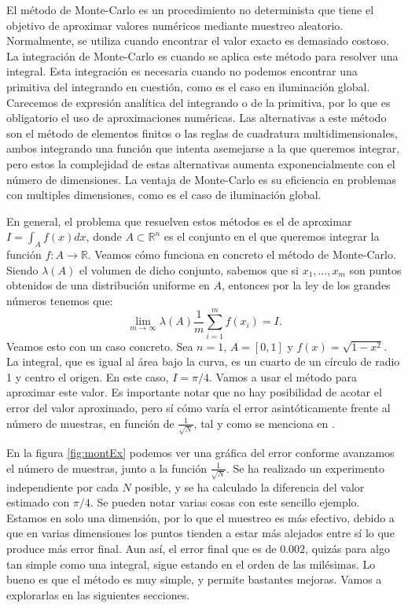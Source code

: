 \documentclass{scrbook}
\begin{document}
El método de Monte-Carlo es un procedimiento no determinista que tiene el objetivo de aproximar valores numéricos mediante muestreo aleatorio. Normalmente, se utiliza cuando encontrar el valor exacto es demasiado costoso. La integración de Monte-Carlo es cuando se aplica este método para resolver una integral. Esta integración es necesaria cuando no podemos encontrar una primitiva del integrando en cuestión, como es el caso en iluminación global. Carecemos de expresión analítica del integrando o de la primitiva, por lo que es obligatorio el uso de aproximaciones numéricas. Las alternativas a este método son el método de elementos finitos o las reglas de cuadratura multidimensionales, ambos integrando una función que intenta asemejarse a la que queremos integrar, pero estos la complejidad de estas alternativas aumenta exponencialmente con el número de dimensiones. La ventaja de Monte-Carlo es su eficiencia en problemas con multiples dimensiones, como es el caso de iluminación global. 

En general, el problema que resuelven estos métodos es el de aproximar $I = \int_{A}f(x) dx$, donde $A\subset\mathds{R}^n$ es el conjunto en el que queremos integrar la función $f:A\rightarrow\mathds{R}$. Veamos cómo funciona en concreto el método de Monte-Carlo. Siendo $\lambda(A)$ el volumen de dicho conjunto, sabemos que si $x_1, \hdots, x_m$ son puntos obtenidos de una distribución uniforme en $A$, entonces por la ley de los grandes números tenemos que:
$$\lim\limits_{m\rightarrow\infty} \lambda(A) \frac{1}{m} \sum_{i=1}^{m} f(x_i) = I.$$
Veamos esto con un caso concreto. Sea $n=1$, $A = [0,1]$ y $f(x) = \sqrt{1-x^2}$. La integral, que es igual al área bajo la curva, es un cuarto de un círculo de radio 1 y centro el origen. En este caso, $I = \pi/4$. Vamos a usar el método para aproximar este valor. Es importante notar que no hay posibilidad de acotar el error del valor aproximado, pero sí cómo varía el error asintóticamente frente al número de muestras, en función de $\frac{1}{\sqrt{N}}$, tal y como se menciona en \cite{Press}.

En la figura \ref{fig:montEx} podemos ver una gráfica del error conforme avanzamos el número de muestras, junto a la función $\frac{1}{\sqrt{N}}$. Se ha realizado un experimento independiente por cada $N$ posible, y se ha calculado la diferencia del valor estimado con $\pi/4$. Se pueden notar varias cosas con este sencillo ejemplo. Estamos en solo una dimensión, por lo que el muestreo es más efectivo, debido a que en varias dimensiones los puntos tienden a estar más alejados entre sí lo que produce más error final. Aun así, el error final que es de $0.002$, quizás para algo tan simple como una integral, sigue estando en el orden de las milésimas. Lo bueno es que el método es muy simple, y permite bastantes mejoras. Vamos a explorarlas en las siguientes secciones.
\end{document}
